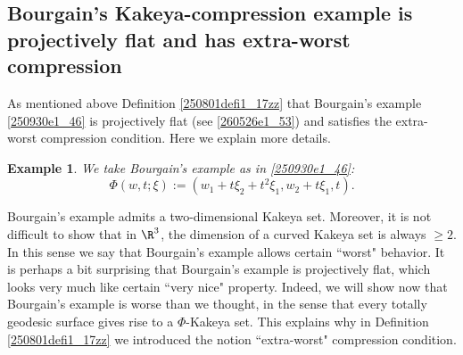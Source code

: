 \documentclass{article}
\numberwithin{equation}{section}
\theoremstyle{plain}
\newtheorem{example}[theorem]{Example}
\begin{document}
\subsection{Bourgain's Kakeya-compression example is projectively flat and has extra-worst compression}\label{250801subsection2_4}


As mentioned above Definition \ref{250801defi1_17zz} that Bourgain's example \eqref{250930e1_46} is projectively flat (see \eqref{260526e1_53}) and satisfies the extra-worst compression condition. Here we explain more details. 


\begin{example}
We take Bourgain's example as in \eqref{250930e1_46}: 
\begin{equation}\label{250930e2_27}
\Phi(w, t; \xi):=
(w_1+ t\xi_2+ t^2\xi_1, w_2+ t\xi_1, t).
\end{equation}
\end{example}



Bourgain's example admits a two-dimensional Kakeya set. Moreover, it is not difficult to show that in $\R^3$, the dimension of a curved Kakeya set is always $\ge 2$. In this sense we say that Bourgain's example allows certain ``worst" behavior. It is perhaps a bit surprising that Bourgain's example is projectively flat, which looks very much like certain ``very nice" property. Indeed, we will show now that Bourgain's example is worse than we thought, in the sense that every totally geodesic surface gives rise to a $\Phi$-Kakeya set. This explains why in Definition \ref{250801defi1_17zz} we introduced the notion ``extra-worst" compression condition. \\
\end{document}
